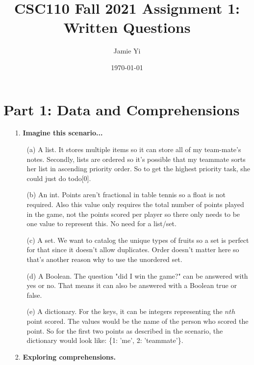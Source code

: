 \documentclass[fontsize=11pt]{article}
\title{CSC110 Fall 2021 Assignment 1: Written Questions}
\author {Jamie Yi}
\date{\today}
\begin{document}
    \maketitle

    \section*{Part 1: Data and Comprehensions}

    \begin{enumerate}
        \item[1.] \textbf{Imagine this scenario...}
        \begin{enumerate}
            \item[(a)]
            A list. It stores multiple items so it can store all of my team-mate's notes. Secondly, lists are ordered so it's possible that my teammate sorts her list in ascending priority order. So to get the highest priority task, she could just do todo[0].

            \item[(b)]
            An int. Points aren't fractional in table tennis so a float is not required. Also this value only requires the total number of points played in the game, not the points scored per player so there only needs to be one value to represent this. No need for a list/set.

            \item[(c)]
            A set. We want to catalog the unique types of fruits so a set is perfect for that since it doesn't allow duplicates. Order doesn't matter here so that's another reason why to use the unordered set.

            \item[(d)]
            A Boolean. The question "did I win the game?" can be answered with yes or no. That means it can also be answered with a Boolean true or false.

            \item[(e)]
            A dictionary. For the keys, it can be integers representing the $nth$ point scored. The values would be the name of the person who scored the point. So for the first two points as described in the scenario, the dictionary would look like: \{1: 'me', 2: 'teammate'\}.
        \end{enumerate}

        \item[2.] \textbf{Exploring comprehensions.}


\end{enumerate}
\end{document}
